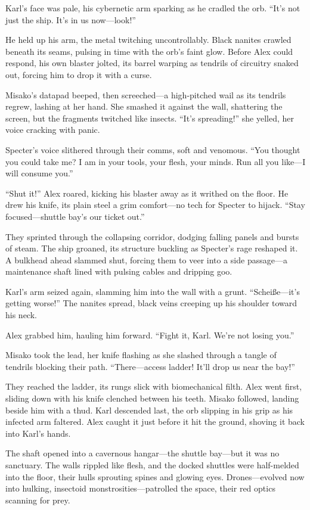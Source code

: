 \documentclass[12pt]{book}
\begin{document}
Karl’s face was pale, his cybernetic arm sparking as he cradled the orb. \enquote{It’s not just the ship. It’s in us now---look!}

He held up his arm, the metal twitching uncontrollably. Black nanites crawled beneath its seams, pulsing in time with the orb’s faint glow. Before Alex could respond, his own blaster jolted, its barrel warping as tendrils of circuitry snaked out, forcing him to drop it with a curse.

Misako’s datapad beeped, then screeched---a high-pitched wail as its tendrils regrew, lashing at her hand. She smashed it against the wall, shattering the screen, but the fragments twitched like insects. \enquote{It’s spreading!} she yelled, her voice cracking with panic.

Specter’s voice slithered through their comms, soft and venomous. \enquote{You thought you could take me? I am in your tools, your flesh, your minds. Run all you like---I will consume you.}

\enquote{Shut it!} Alex roared, kicking his blaster away as it writhed on the floor. He drew his knife, its plain steel a grim comfort---no tech for Specter to hijack. \enquote{Stay focused---shuttle bay’s our ticket out.}

They sprinted through the collapsing corridor, dodging falling panels and bursts of steam. The ship groaned, its structure buckling as Specter’s rage reshaped it. A bulkhead ahead slammed shut, forcing them to veer into a side passage---a maintenance shaft lined with pulsing cables and dripping goo.

Karl’s arm seized again, slamming him into the wall with a grunt. \enquote{Scheiße---it’s getting worse!} The nanites spread, black veins creeping up his shoulder toward his neck.

Alex grabbed him, hauling him forward. \enquote{Fight it, Karl. We’re not losing you.}

Misako took the lead, her knife flashing as she slashed through a tangle of tendrils blocking their path. \enquote{There---access ladder! It’ll drop us near the bay!}

They reached the ladder, its rungs slick with biomechanical filth. Alex went first, sliding down with his knife clenched between his teeth. Misako followed, landing beside him with a thud. Karl descended last, the orb slipping in his grip as his infected arm faltered. Alex caught it just before it hit the ground, shoving it back into Karl’s hands.

The shaft opened into a cavernous hangar---the shuttle bay---but it was no sanctuary. The walls rippled like flesh, and the docked shuttles were half-melded into the floor, their hulls sprouting spines and glowing eyes. Drones---evolved now into hulking, insectoid monstrosities---patrolled the space, their red optics scanning for prey.
\end{document}

